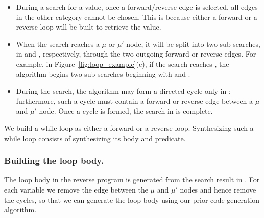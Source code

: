 \documentclass[12pt]{gatech-thesis}
\begin{document}
\begin{itemize}
\item During a search for a value, once a forward/reverse edge is selected, all edges in the other category cannot be chosen. This is because either a forward or a reverse loop will be built to retrieve the value.

\item When the search reaches a $\mu$ or $\mu'$ node, it will be split into two sub-searches, in \pVSG and \lVSG, respectively, through the two outgoing forward or reverse edges.
For example, in Figure~\ref{fig:loop_example}(c), if the search reaches \vmu, the algorithm begins two sub-searches beginning with \vinit and \viter.

\item During the search, the algorithm may form a directed cycle only in \lVSG; furthermore, such a cycle must contain a forward or reverse edge between a $\mu$ and $\mu'$ node. 
Once a cycle is formed, the search in \lVSG is complete.
\end{itemize}

\noindent
We build a while loop as either a forward or a reverse loop. 
Synthesizing such a while loop consists of synthesizing its body and predicate.


\subsubsection{Building the loop body.}

The loop body in the reverse program is generated from the search result in \lVSG.
For each variable we remove the edge between the $\mu$ and $\mu'$ nodes and hence remove the cycles, so that we can generate the loop body using our prior code generation algorithm.

\end{document}

